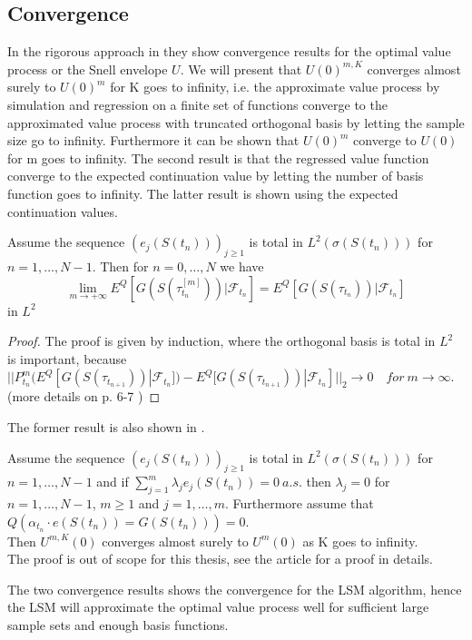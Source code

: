 \subsection{Convergence}
In the rigorous approach in \parencite{analysisLSM} they show convergence results for the optimal value process or the Snell envelope $U$. We will present that $U(0)^{m,K}$ converges almost surely to $U(0)^{m}$ for K goes to infinity, i.e. the approximate value process by simulation and regression on a finite set of functions converge to the approximated value process with truncated orthogonal basis by letting the sample size go to infinity. Furthermore it can be shown that $U(0)^{m}$ converge to $U(0)$ for m goes to infinity. The second result is that the regressed value function converge to the expected continuation value by letting the number of basis function goes to infinity. The latter result is shown using the expected continuation values.
\begin{theorem}\label{LSMConvergence1}
Assume the sequence $(e_{j}(S(t_n)))_{j\geq 1}$ is total in $L^2(\sigma(S(t_n)))$ for $n=1,\ldots,N-1$. Then for $n=0,\ldots,N$ we have
$$\lim_{m\to +\infty} E^Q[G(S(\tau_{t_n}^{[m]})) |\mathcal{F}_{t_n}]=E^Q[G(S(\tau_{t_n})) |\mathcal{F}_{t_n}]$$
in $L^2$
\begin{proof}
The proof is given by induction, where the orthogonal basis is total in $L^2$ is important, because $||P^m_{t_n}(E^Q[G(S(\tau_{t_{n+1}}))|\mathcal{F}_{t_n}])- E^Q[G(S(\tau_{t_{n+1}}))|\mathcal{F}_{t_n}]||_2 \to 0 \quad for \ m \to \infty$.
(more details on p. 6-7 \parencite{analysisLSM})
\end{proof}
\end{theorem}

The former result is also shown in \parencite{analysisLSM}.
\begin{theorem}\label{LSMConvergence2}
Assume the sequence $(e_{j}(S(t_n)))_{j\geq 1}$ is total in $L^2(\sigma(S(t_n)))$ for $n=1,\ldots,N-1$ and if $\sum_{j=1}^{m} \lambda_j e_{j}(S(t_n))=0 \ a.s.$ then $\lambda_j=0$ for $n=1,\ldots,N-1$, $m\geq 1$ and $j=1,\ldots,m$. Furthermore assume that $Q(\alpha_{t_n} \cdot e(S(t_n))=G(S(t_n)))=0$.\\
Then $U^{m,K}(0)$ converges almost surely to $U^{m}(0)$ as K goes to infinity.\\
The proof is out of scope for this thesis, see the article \parencite{analysisLSM} for a proof in details. 
\end{theorem}

The two convergence results shows the convergence for the LSM algorithm, hence the LSM will approximate the optimal value process well for sufficient large sample sets and enough basis functions.
